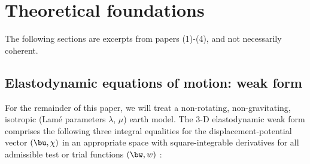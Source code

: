 \section{Theoretical foundations}
The following sections are excerpts from papers (1)-(4), and not necessarily coherent.

\subsection{Elastodynamic equations of motion: weak form}
For the remainder of this paper, we will treat a non-rotating, 
non-gravitating, isotropic (Lam\'{e} parameters $\lambda$, $\mu$)
earth model. The 3-D elastodynamic weak form comprises the following
three integral equalities for the displacement-potential vector 
$(\bu,\chi)$ in an appropriate space with square-integrable derivatives
for all admissible test or trial functions $(\bw,w)$ \citep{nissen+:07a}:
%
\eqa \label{eq:weak1}
\nonumber\\
\ena
%
\eqa \label{eq:weak2}
\ena
%
\eqa \label{eq:weak3}
\nonumber\\
